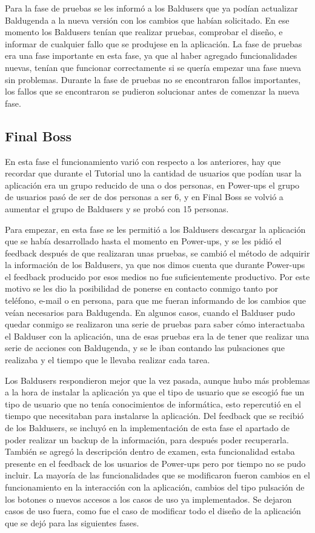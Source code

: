 Para la fase de pruebas se les informó a los Baldusers que ya podían actualizar Baldugenda a la nueva versión con los cambios que habían solicitado. En ese momento los Baldusers tenían que realizar pruebas, comprobar el diseño, e informar de  cualquier fallo que se produjese en la aplicación. La fase de pruebas era una fase importante en esta fase, ya que al haber agregado funcionalidades nuevas, tenían que funcionar correctamente si se quería empezar una fase nueva sin problemas. Durante la fase de pruebas no se encontraron fallos importantes, los fallos que se encontraron se pudieron solucionar antes de comenzar la nueva fase.
\newpage
\subsection{Final Boss}
\label{subsecc:final boss}

En esta fase el funcionamiento varió con respecto a los anteriores, hay que recordar que durante el Tutorial uno la cantidad de usuarios que podían usar la aplicación era un grupo reducido de una o dos personas, en Power-ups el grupo de usuarios pasó de ser de dos personas a ser 6, y en Final Boss se volvió a aumentar el grupo de Baldusers y se probó con 15 personas.

Para empezar, en esta fase se les permitió a los Baldusers descargar la aplicación que se había desarrollado hasta el momento en Power-ups, y se les pidió el feedback después de que realizaran unas pruebas, se cambió el método de adquirir la información de los Baldusers, ya que nos dimos cuenta que durante Power-ups el feedback producido por esos medios no fue suficientemente productivo. Por este motivo se les dio la posibilidad de ponerse en contacto conmigo tanto por teléfono, e-mail o en persona, para que me fueran informando de los cambios que veían necesarios para Baldugenda.
En algunos casos, cuando el Balduser pudo quedar conmigo se realizaron una serie de pruebas para saber cómo interactuaba el Balduser con la aplicación, una de esas pruebas era la de tener que realizar una serie de acciones con Baldugenda, y se le iban contando las pulsaciones que realizaba y el tiempo que le llevaba realizar cada tarea.

Los Baldusers respondieron mejor que la vez pasada, aunque hubo más problemas a la hora de instalar la aplicación ya que el tipo de usuario que se escogió fue un tipo de usuario que no tenía conocimientos de informática, esto repercutió en el tiempo que necesitaban para instalarse la aplicación. Del feedback que se recibió de los Baldusers, se incluyó en la implementación de esta fase el apartado de poder realizar un backup de la información, para después poder recuperarla. También se agregó la descripción dentro de examen, esta funcionalidad estaba presente en el feedback de los usuarios de Power-ups pero por tiempo no se pudo incluir. La mayoría de las funcionalidades que se modificaron fueron cambios en el funcionamiento en la interacción con la aplicación, cambios del tipo pulsación de los botones o nuevos accesos a los casos de uso ya implementados. Se dejaron casos de uso fuera, como fue el caso de modificar todo el diseño de la aplicación que se dejó para las siguientes fases.

